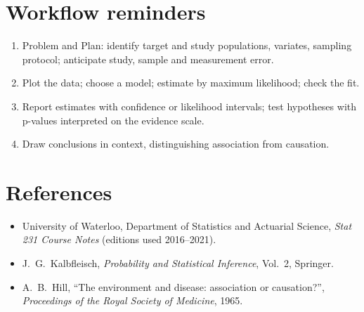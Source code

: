 \section{Workflow reminders}

\begin{enumerate}
  \item Problem and Plan: identify target and study populations, variates, sampling
        protocol; anticipate study, sample and measurement error.
  \item Plot the data; choose a model; estimate by maximum likelihood; check the fit.
  \item Report estimates with confidence or likelihood intervals; test hypotheses with
        p-values interpreted on the evidence scale.
  \item Draw conclusions in context, distinguishing association from causation.
\end{enumerate}

\section*{References}
\begin{itemize}
  \item University of Waterloo, Department of Statistics and Actuarial Science,
        \emph{Stat 231 Course Notes} (editions used 2016--2021).
  \item J.~G.~Kalbfleisch, \emph{Probability and Statistical Inference}, Vol.~2,
        Springer.
  \item A.~B.~Hill, ``The environment and disease: association or causation?'',
        \emph{Proceedings of the Royal Society of Medicine}, 1965.
\end{itemize}
